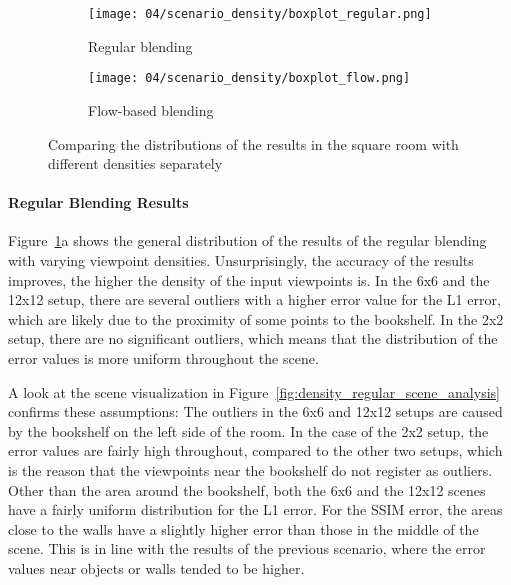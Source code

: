 \begin{figure}
\centering
    \hfill
    \begin{subfigure}[b]{0.5\textwidth}
            \centering
            \texttt{[image: 04/scenario\_density/boxplot\_regular.png]}
            \caption{Regular blending}
    \end{subfigure}%
    \hfill
    \begin{subfigure}[b]{0.5\textwidth}
            \centering
            \texttt{[image: 04/scenario\_density/boxplot\_flow.png]}
            \caption{Flow-based blending}
    \end{subfigure}
    \hfill
  \caption[Comparing the distributions of the results with different densities separately]{Comparing the distributions of the results in the square room with different densities separately}
  \label{fig:density_boxplot_split}
\end{figure}

\paragraph{Regular Blending Results}
Figure~\ref{fig:density_boxplot_split}a shows the general distribution of the results of the regular blending with varying viewpoint densities. Unsurprisingly, the accuracy of the results improves, the higher the density of the input viewpoints is.
In the 6x6 and the 12x12 setup, there are several outliers with a higher error value for the L1 error, which are likely due to the proximity of some points to the bookshelf. In the 2x2 setup, there are no significant outliers, which means that the distribution of the error values is more uniform throughout the scene.

A look at the scene visualization in Figure~\ref{fig:density_regular_scene_analysis} confirms these assumptions: The outliers in the 6x6 and 12x12 setups are caused by the bookshelf on the left side of the room. In the case of the 2x2 setup, the error values are fairly high throughout, compared to the other two setups, which is the reason that the viewpoints near the bookshelf do not register as outliers. Other than the area around the bookshelf, both the 6x6 and the 12x12 scenes have a fairly uniform distribution for the L1 error. For the SSIM error, the areas close to the walls have a slightly higher error than those in the middle of the scene. This is in line with the results of the previous scenario, where the error values near objects or walls tended to be higher.

